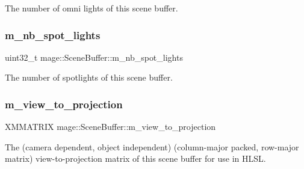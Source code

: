 The number of omni lights of this scene buffer. \hypertarget{structmage_1_1_scene_buffer_a8f46fafa2241a36c7e8060294ee6c4d3}{}\label{structmage_1_1_scene_buffer_a8f46fafa2241a36c7e8060294ee6c4d3} 
\subsubsection{\texorpdfstring{m\+\_\+nb\+\_\+spot\+\_\+lights}{m\_nb\_spot\_lights}}
{\footnotesize\ttfamily uint32\+\_\+t mage\+::\+Scene\+Buffer\+::m\+\_\+nb\+\_\+spot\+\_\+lights}

The number of spotlights of this scene buffer. \hypertarget{structmage_1_1_scene_buffer_ab7028f3a8bd6abbb9a8942c0ea86983a}{}\label{structmage_1_1_scene_buffer_ab7028f3a8bd6abbb9a8942c0ea86983a} 
\subsubsection{\texorpdfstring{m\+\_\+view\+\_\+to\+\_\+projection}{m\_view\_to\_projection}}
{\footnotesize\ttfamily X\+M\+M\+A\+T\+R\+IX mage\+::\+Scene\+Buffer\+::m\+\_\+view\+\_\+to\+\_\+projection}

The (camera dependent, object independent) (column-\/major packed, row-\/major matrix) view-\/to-\/projection matrix of this scene buffer for use in H\+L\+SL. 